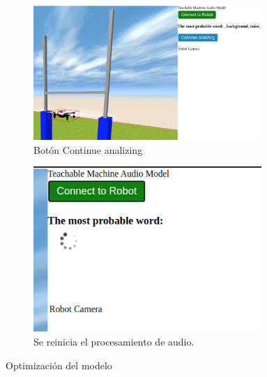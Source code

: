 \begin{figure}[H]
  \begin{subfigure}[b]{0.5\textwidth}
  \centering
    \includegraphics[width=0.95\textwidth, height=0.7\textwidth]{chapters/images/optimizacionaudio.png}
    \caption{Botón Continue analizing }
    \label{fig:f1}
  \end{subfigure}
  \hfill
  \begin{subfigure}[b]{0.5\textwidth}
  \centering
    \includegraphics[width=0.95\textwidth, height=0.7\textwidth]{chapters/images/optimizacionaudio2.png}
	\caption{Se reinicia el procesamiento de audio.}    
    \label{fig:f2}
 
  \end{subfigure}
  \caption{Optimización del modelo }
\end{figure}


